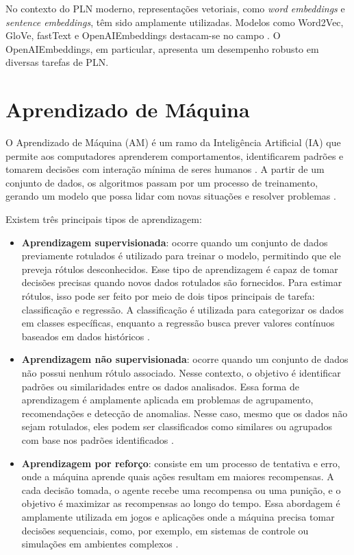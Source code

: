 No contexto do PLN moderno, representações vetoriais, como \textit{word embeddings} e \textit{sentence embeddings}, têm sido amplamente utilizadas. Modelos como Word2Vec, GloVe, fastText e OpenAIEmbeddings destacam-se no campo \cite{devlin2019}. O OpenAIEmbeddings, em particular, apresenta um desempenho robusto em diversas tarefas de PLN.

\section {Aprendizado de Máquina}

O Aprendizado de Máquina (AM) é um ramo da Inteligência Artificial (IA) que permite aos computadores aprenderem comportamentos, identificarem padrões e tomarem decisões com interação mínima de seres humanos \cite{mitchell1997}. A partir de um conjunto de dados, os algoritmos passam por um processo de treinamento, gerando um modelo que possa lidar com novas situações e resolver problemas \cite{tan2006}.

Existem três principais tipos de aprendizagem:

\begin{itemize}
    \item \textbf{Aprendizagem supervisionada}: ocorre quando um conjunto de dados previamente rotulados é utilizado para treinar o modelo, permitindo que ele preveja rótulos desconhecidos. Esse tipo de aprendizagem é capaz de tomar decisões precisas quando novos dados rotulados são fornecidos. Para estimar rótulos, isso pode ser feito por meio de dois tipos principais de tarefa: classificação e regressão. A classificação é utilizada para categorizar os dados em classes específicas, enquanto a regressão busca prever valores contínuos baseados em dados históricos \cite{faceli2011}.

    \item \textbf{Aprendizagem não supervisionada}: ocorre quando um conjunto de dados não possui nenhum rótulo associado. Nesse contexto, o objetivo é identificar padrões ou similaridades entre os dados analisados. Essa forma de aprendizagem é amplamente aplicada em problemas de agrupamento, recomendações e detecção de anomalias. Nesse caso, mesmo que os dados não sejam rotulados, eles podem ser classificados como similares ou agrupados com base nos padrões identificados \cite{faceli2011}.

    \item \textbf{Aprendizagem por reforço}: consiste em um processo de tentativa e erro, onde a máquina aprende quais ações resultam em maiores recompensas. A cada decisão tomada, o agente recebe uma recompensa ou uma punição, e o objetivo é maximizar as recompensas ao longo do tempo. Essa abordagem é amplamente utilizada em jogos e aplicações onde a máquina precisa tomar decisões sequenciais, como, por exemplo, em sistemas de controle ou simulações em ambientes complexos \cite{cerri2017}.
\end{itemize}

